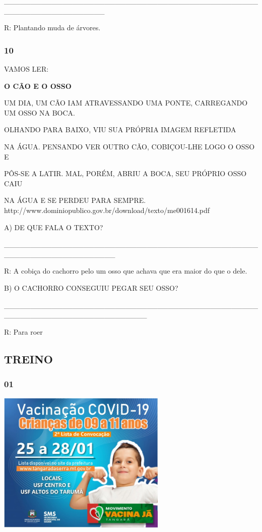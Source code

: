 \_\_\_\_\_\_\_\_\_\_\_\_\_\_\_\_\_\_\_\_\_\_\_\_\_\_\_\_\_\_\_\_\_\_\_\_\_\_\_\_\_\_\_\_\_\_\_\_\_\_\_\_\_\_\_\_\_\_\_\_\_\_\_\_\_\_\_

R: Plantando muda de árvores.

\subsubsection{10 }\label{section-64}

VAMOS LER:

\textbf{O CÃO E O OSSO}

UM DIA, UM CÃO IAM ATRAVESSANDO UMA PONTE, CARREGANDO UM OSSO NA BOCA.

OLHANDO PARA BAIXO, VIU SUA PRÓPRIA IMAGEM REFLETIDA

NA ÁGUA. PENSANDO VER OUTRO CÃO, COBIÇOU-LHE LOGO O OSSO E

PÔS-SE A LATIR. MAL, PORÉM, ABRIU A BOCA, SEU PRÓPRIO OSSO CAIU

NA ÁGUA E SE PERDEU PARA SEMPRE.
http://www.dominiopublico.gov.br/download/texto/me001614.pdf

A) DE QUE FALA O TEXTO?

\_\_\_\_\_\_\_\_\_\_\_\_\_\_\_\_\_\_\_\_\_\_\_\_\_\_\_\_\_\_\_\_\_\_\_\_\_\_\_\_\_\_\_\_\_\_\_\_\_\_\_\_\_\_\_\_\_\_\_\_\_\_\_\_\_\_\_\_\_

R: A cobiça do cachorro pelo um osso que achava que era maior do que o
dele.

B) O CACHORRO CONSEGUIU PEGAR SEU OSSO?

\_\_\_\_\_\_\_\_\_\_\_\_\_\_\_\_\_\_\_\_\_\_\_\_\_\_\_\_\_\_\_\_\_\_\_\_\_\_\_\_\_\_\_\_\_\_\_\_\_\_\_\_\_\_\_\_\_\_\_\_\_\_\_\_\_\_\_\_\_\_\_\_\_\_\_

R: Para roer

\subsection{TREINO}\label{treino-4}

\subsubsection{01}\label{section-65}

\includegraphics[width=3.17910in,height=2.68418in]{media/image124.jpeg}

